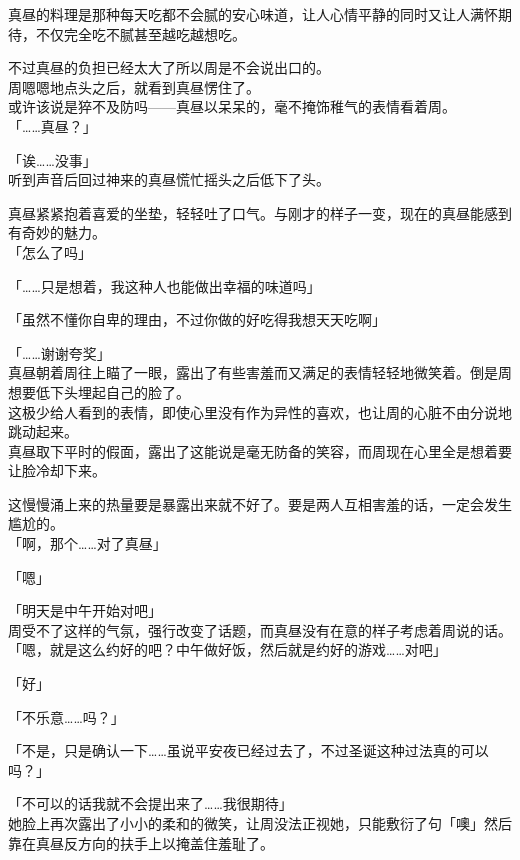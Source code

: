 真昼的料理是那种每天吃都不会腻的安心味道，让人心情平静的同时又让人满怀期待，不仅完全吃不腻甚至越吃越想吃。

不过真昼的负担已经太大了所以周是不会说出口的。\\

周嗯嗯地点头之后，就看到真昼愣住了。\\

或许该说是猝不及防吗——真昼以呆呆的，毫不掩饰稚气的表情看着周。\\

「……真昼？」

「诶……没事」\\

听到声音后回过神来的真昼慌忙摇头之后低下了头。

真昼紧紧抱着喜爱的坐垫，轻轻吐了口气。与刚才的样子一变，现在的真昼能感到有奇妙的魅力。\\

「怎么了吗」

「……只是想着，我这种人也能做出幸福的味道吗」

「虽然不懂你自卑的理由，不过你做的好吃得我想天天吃啊」

「……谢谢夸奖」\\

真昼朝着周往上瞄了一眼，露出了有些害羞而又满足的表情轻轻地微笑着。倒是周想要低下头埋起自己的脸了。\\

这极少给人看到的表情，即使心里没有作为异性的喜欢，也让周的心脏不由分说地跳动起来。\\

真昼取下平时的假面，露出了这能说是毫无防备的笑容，而周现在心里全是想着要让脸冷却下来。

这慢慢涌上来的热量要是暴露出来就不好了。要是两人互相害羞的话，一定会发生尴尬的。\\

「啊，那个……对了真昼」

「嗯」

「明天是中午开始对吧」\\

周受不了这样的气氛，强行改变了话题，而真昼没有在意的样子考虑着周说的话。\\

「嗯，就是这么约好的吧？中午做好饭，然后就是约好的游戏……对吧」

「好」

「不乐意……吗？」

「不是，只是确认一下……虽说平安夜已经过去了，不过圣诞这种过法真的可以吗？」

「不可以的话我就不会提出来了……我很期待」\\

她脸上再次露出了小小的柔和的微笑，让周没法正视她，只能敷衍了句「噢」然后靠在真昼反方向的扶手上以掩盖住羞耻了。\\

